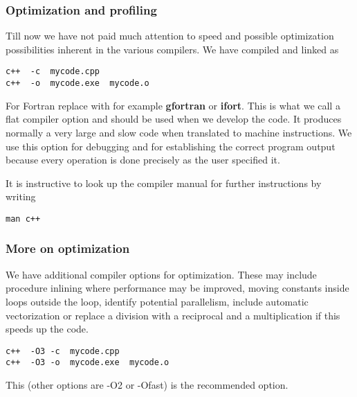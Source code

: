 \documentclass{beamer}
\begin{document}
\begin{frame}
\frametitle{Optimization and profiling}

\begin{block}{}


Till now we have not paid much attention to speed and possible optimization possibilities
inherent in the various compilers. We have compiled and linked as
\begin{verbatim}
c++  -c  mycode.cpp
c++  -o  mycode.exe  mycode.o
\end{verbatim}
For Fortran replace with for example \textbf{gfortran} or \textbf{ifort}.
This is what we call a flat compiler option and should be used when we develop the code.
It produces normally a very large and slow code when translated to machine instructions.
We use this option for debugging and for establishing the correct program output because
every operation is done precisely as the user specified it.

It is instructive to look up the compiler manual for further instructions by writing
\begin{verbatim}
man c++
\end{verbatim}

\end{block}
\end{frame}

\begin{frame}
\frametitle{More on optimization}

\begin{block}{}
We have additional compiler options for optimization. These may include procedure inlining where 
performance may be improved, moving constants inside loops outside the loop, 
identify potential parallelism, include automatic vectorization or replace a division with a reciprocal
and a multiplication if this speeds up the code.
\begin{verbatim}
c++  -O3 -c  mycode.cpp
c++  -O3 -o  mycode.exe  mycode.o
\end{verbatim}
This (other options are -O2 or -Ofast) is the recommended option. 


\end{block}
\end{frame}
\end{document}
